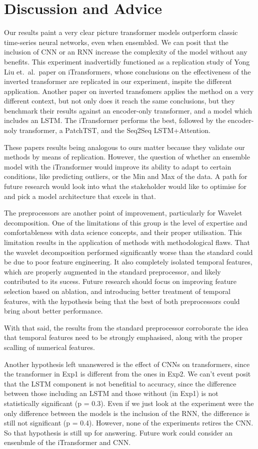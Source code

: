 \section{Discussion and Advice}

Our results paint a very clear picture \- transformer models outperform classic time-series neural networks, even when ensembled. We can posit that the inclusion of CNN or an RNN increase the complexity of the model without any benefits.
This experiment inadvertidly functioned as a replication study of Yong Liu et.\ al.\ paper on iTransformers\cite{iTrans}, whose conclusions on the effectiveness of the inverted transformer are replicated in our experiment, inspite the different application.
Another paper on inverted transfomers applies the method on a very different context, but not only does it reach the same conclusions, but they benchmark their results against an encoder-only transformer, and a model which includes an LSTM\cite{10877800}.
The iTransformer performs the best, followed by the encoder-noly transformer, a PatchTST, and the Seq2Seq LSTM+Attention.

These papers results being analogous to ours matter because they validate our methods by means of replication. However, the question of whether an ensemble model with the iTransformer would improve its ability to adapt to certain conditions, like predicting outliers, or the Min and Max of the data. A path for future research would look into what the stakeholder would like to optimise for and pick a model architecture that excels in that.

The preprocessors are another point of improvement, particularly for Wavelet decomposition. One of the limitations of this group is the level of expertise and comfortableness with data science concepts, and their proper utilisation. This limitation results in the application of methods with methodological flaws.
That the wavelet decomposition performed significantly worse than the standard could be due to poor feature engineering. It also completely isolated temporal features, which are properly augmented in the standard preprocessor, and likely contributed to its sucess.
Future research should focus on improving feature selection based on ablation, and introducing better treatment of temporal features, with the hypothesis being that the best of both preprocessors could bring about better performance.

With that said, the results from the standard preprocessor corroborate the idea that temporal features need to be strongly emphasised, along with the proper scalling of numerical features.

Another hypothesis left unanswered is the effect of CNNs on transformers, since the transformer in Exp1 is different from the ones in Exp2. We can't event posit that the LSTM component is not benefitial to accuracy, since the difference between those including an LSTM and those without (in Exp1) is not statistically significant (p = 0.3).
Even if we just look at the experiment were the only difference between the models is the inclusion of the RNN, the difference is still not significant (p = 0.4). However, none of the experiments retires the CNN. So that hypothesis is still up for answering. Future work could consider an ensenbmle of the iTransformer and CNN.